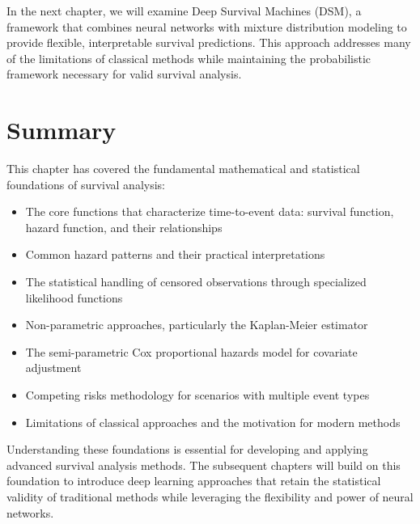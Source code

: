 \begin{notebox}[title=Looking Ahead]
In the next chapter, we will examine Deep Survival Machines (DSM), a framework that combines neural networks with mixture distribution modeling to provide flexible, interpretable survival predictions. This approach addresses many of the limitations of classical methods while maintaining the probabilistic framework necessary for valid survival analysis.
\end{notebox}

\section{Summary}

This chapter has covered the fundamental mathematical and statistical foundations of survival analysis:
\begin{itemize}
    \item The core functions that characterize time-to-event data: survival function, hazard function, and their relationships
    \item Common hazard patterns and their practical interpretations
    \item The statistical handling of censored observations through specialized likelihood functions
    \item Non-parametric approaches, particularly the Kaplan-Meier estimator
    \item The semi-parametric Cox proportional hazards model for covariate adjustment
    \item Competing risks methodology for scenarios with multiple event types
    \item Limitations of classical approaches and the motivation for modern methods
\end{itemize}

Understanding these foundations is essential for developing and applying advanced survival analysis methods. The subsequent chapters will build on this foundation to introduce deep learning approaches that retain the statistical validity of traditional methods while leveraging the flexibility and power of neural networks.
